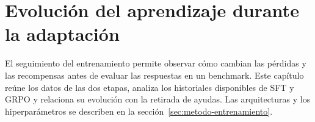 \chapter{Evolución del aprendizaje durante la adaptación}
\label{ch:evolucion-entrenamiento}
El seguimiento del entrenamiento permite observar cómo cambian las pérdidas y las recompensas antes de evaluar las respuestas en un benchmark. Este capítulo reúne los datos de las dos etapas, analiza los historiales disponibles de SFT y GRPO y relaciona su evolución con la retirada de ayudas. Las arquitecturas y los hiperparámetros se describen en la sección~\ref{sec:metodo-entrenamiento}.





